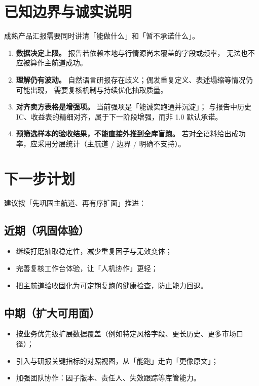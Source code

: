 \documentclass[UTF8,a4paper,11pt]{ctexart}
\begin{document}
\section{已知边界与诚实说明}

成熟产品汇报需要同时讲清「能做什么」和「暂不承诺什么」。

\begin{enumerate}
  \item \textbf{数据决定上限。} 报告若依赖本地与行情源尚未覆盖的字段或频率，
        无法也不应被算作主航道成功。
  \item \textbf{理解仍有波动。} 自然语言研报存在歧义；偶发重复定义、表述塌缩等情况仍可能出现，
        需要复核机制与持续优化抽取质量。
  \item \textbf{对齐卖方表格是增强项。} 当前强项是「能诚实跑通并沉淀」；
        与报告中历史 IC、收益表的精细对齐，属于下一阶段增强，而非 1.0 默认承诺。
  \item \textbf{预筛选样本的验收结果，不能直接外推到全库盲跑。}
        若对全语料给出成功率，应采用分层统计（主航道 / 边界 / 明确不支持）。
\end{enumerate}

\section{下一步计划}

建议按「先巩固主航道、再有序扩面」推进：

\subsection{近期（巩固体验）}

\begin{itemize}
  \item 继续打磨抽取稳定性，减少重复因子与无效变体；
  \item 完善复核工作台体验，让「人机协作」更轻；
  \item 把主航道验收固化为可定期复跑的健康检查，防止能力回退。
\end{itemize}

\subsection{中期（扩大可用面）}

\begin{itemize}
  \item 按业务优先级扩展数据覆盖（例如特定风格字段、更长历史、更多市场口径）；
  \item 引入与研报关键指标的对照视图，从「能跑」走向「更像原文」；
  \item 加强团队协作：因子版本、责任人、失效跟踪等库管能力。
\end{itemize}
\end{document}
